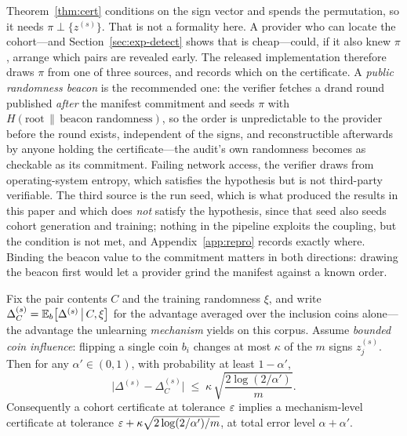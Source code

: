 \begin{remark}\label{rem:order}
Theorem~\ref{thm:cert} conditions on the sign vector and spends the permutation, so it
needs $\pi \perp \{z^{(s)}\}$. That is not a formality here. A provider
who can locate the cohort---and Section~\ref{sec:exp-detect} shows that is
cheap---could, if it also knew $\pi$, arrange which pairs are revealed early. The
released implementation therefore draws $\pi$ from one of three sources, and records
which on the certificate. A \emph{public randomness beacon} is the recommended one:
the verifier fetches a drand round published \emph{after} the manifest commitment and
seeds $\pi$ with $H(\text{root} \,\|\, \text{beacon randomness})$, so the order is
unpredictable to the provider before the round exists, independent of the signs, and
reconstructible afterwards by anyone holding the certificate---the audit's own
randomness becomes as checkable as its commitment. Failing network access, the
verifier draws from operating-system entropy, which satisfies the hypothesis but is
not third-party verifiable. The third source is the run seed, which is what produced
the results in this paper and which does \emph{not} satisfy the hypothesis, since that
seed also seeds cohort generation and training; nothing in the pipeline exploits the
coupling, but the condition is not met, and Appendix~\ref{app:repro} records exactly
where. Binding the beacon value to the commitment matters in both directions: drawing
the beacon first would let a provider grind the manifest against a known order.
\end{remark}

\begin{proposition}\label{prop:transfer}
Fix the pair contents $C$ and the training randomness $\xi$, and write
$\Delta^{(s)}_C = \mathbb{E}_b\bigl[\Delta^{(s)} \,\big|\, C, \xi\bigr]$ for the
advantage averaged over the inclusion coins alone---the advantage the unlearning
\emph{mechanism} yields on this corpus. Assume \emph{bounded coin influence}:
flipping a single coin $b_i$ changes at most $\kappa$ of the $m$ signs
$z_j^{(s)}$. Then for any $\alpha' \in (0,1)$, with probability at least
$1-\alpha'$,
\begin{equation}\label{eq:transfer}
\bigl|\Delta^{(s)} - \Delta^{(s)}_C\bigr| \;\le\;
\kappa\,\sqrt{\frac{2\log(2/\alpha')}{m}} .
\end{equation}
Consequently a cohort certificate at tolerance $\varepsilon$ implies a mechanism-level
certificate at tolerance $\varepsilon + \kappa\sqrt{2\log(2/\alpha')/m}$, at total error
level $\alpha + \alpha'$.
\end{proposition}

